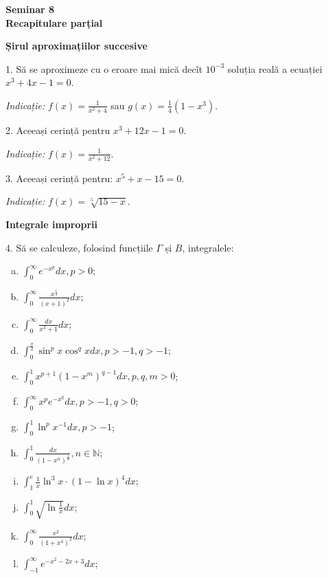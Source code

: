 \documentclass[11pt,a4paper]{article}
\newcommand\ds{\displaystyle}
\newcommand\NN{\mathbb{N}}
\theoremstyle{dotless}
\theoremstyle{dotlessdr}
\begin{document}
\begin{center}
  {\large\textbf{Seminar 8 \\ Recapitulare parțial}}
\end{center}

\vspace{1cm}

\textbf{Șirul aproximațiilor succesive}

1. Să se aproximeze cu o eroare mai mică decît $ 10^{-3} $ soluția reală
a ecuației $ x^3 + 4x - 1 = 0 $.

\emph{Indicație:} $ f(x) = \frac{1}{x^2 + 4} $ sau $ g(x) = \frac{1}{4}(1 - x^3) $.

\vspace{1cm}

2. Aceeași cerință pentru $ x^3 + 12x - 1 = 0 $.

\emph{Indicație:} $ f(x) = \frac{1}{x^2 + 12} $.

\vspace{1cm}

3. Aceeași cerință pentru: $ x^5 + x - 15 = 0 $.

\emph{Indicație:} $ f(x) = \sqrt[5]{15 - x} $.

\vspace{2cm}


\textbf{Integrale improprii}

4. Să se calculeze, folosind funcțiile $\Gamma$ și $B$, integralele:
\begin{enumerate}[(a)]
\item $ \ds\int_0^\infty e^{-x^p} dx, p > 0 $;
\item $ \ds\int_0^{\infty} \frac{x^{\frac{1}{4}}}{(x + 1)^2} dx $;
\item $ \ds\int_0^\infty \frac{dx}{x^3 + 1} dx $;
\item $ \ds\int_0^{\frac{\pi}{2}} \sin^p x \cos^q x dx, p > -1, q > - 1 $;
\item $ \ds\int_0^1 x^{p+1}(1-x^m)^{q - 1} dx, p, q, m > 0 $;
\item $ \ds\int_0^\infty x^p e^{-x^q} dx, p > -1, q > 0 $;
\item $ \ds\int_0^1 \ln^p x^{-1} dx, p > -1 $;
\item $ \ds\int_0^1 \frac{dx}{(1 - x^n)^{\frac{1}{n}}}, n \in \NN $;
\item $ \ds\int_1^e \frac{1}{x} \ln^3 x \cdot (1 - \ln x)^4 dx $;
\item $ \ds\int_0^1 \sqrt{\ln \frac{1}{x}} dx $;
\item $ \ds\int_0^\infty \frac{x^2}{(1 + x^4)^2} dx $;
\item $ \ds\int_{-1}^\infty e^{-x^2 - 2x + 3} dx $;
\end{enumerate}
\end{document}
